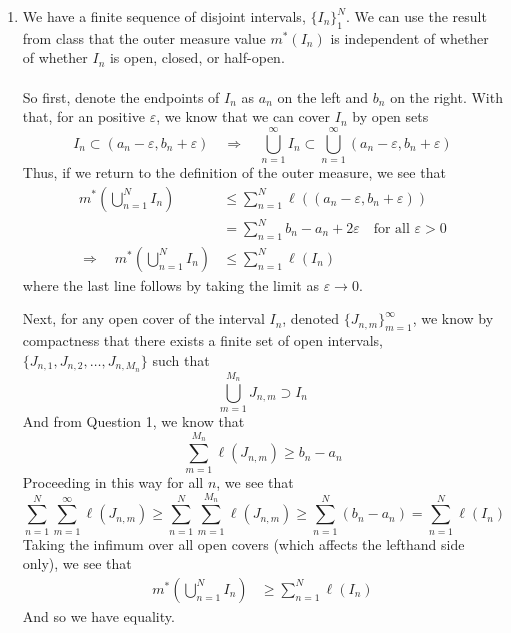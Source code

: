 \documentclass[12pt]{article}
\theoremstyle{plain}
\theoremstyle{definition}
\theoremstyle{remark}
\begin{document}
\begin{enumerate}
\item We have a finite sequence of disjoint intervals, $\{I_n\}_1^N$. We can use the result from class that the outer measure value $m^*(I_n)$ is independent of whether of whether $I_n$ is open, closed, or half-open.
\\
\\
So first, denote the endpoints of $I_n$ as $a_n$ on the left and $b_n$ on the right. With that, for an positive $\varepsilon$, we know that we can cover $I_n$ by open sets
\[
    I_n \subset (a_n-\varepsilon, b_n+\varepsilon)
    \quad \Rightarrow\quad
    \bigcup^\infty_{n=1} I_n \subset 
    \bigcup^\infty_{n=1}(a_n-\varepsilon, b_n+\varepsilon)
\]
Thus, if we return to the definition of the outer measure, we see that 
\begin{align*}
    m^*\left(\bigcup^N_{n=1} I_n\right) &\leq 
    \sum^N_{n=1} \ell\left((a_n-\varepsilon, b_n+\varepsilon)
    \right) \\
    &= \sum^N_{n=1} b_n - a_n + 2\varepsilon 
    \quad \text{for all $\varepsilon>0$}\\
    \Rightarrow\quad
    m^*\left(\bigcup^N_{n=1} I_n\right) &\leq 
    \sum^N_{n=1} \ell(I_n) 
\end{align*}
where the last line follows by taking the limit as $\varepsilon\rightarrow 0$.

Next, for any open cover of the interval $I_n$, denoted $\{J_{n,m}\}_{m=1}^\infty$, we know by compactness that there exists a finite set of open intervals, $\{J_{n,1}, J_{n,2}, \ldots,J_{n,M_n}\}$ such that 
\[
    \bigcup^{M_n}_{m=1} J_{n,m} \supset I_n
\]
And from Question 1, we know that 
\begin{equation}
    \sum^{M_n}_{m=1} \ell(J_{n,m}) \geq b_n - a_n
\end{equation}
Proceeding in this way for all $n$, we see that 
\begin{equation}
    \sum^N_{n=1} 
    \sum^{\infty}_{m=1} \ell(J_{n,m}) \geq 
    \sum^N_{n=1} 
    \sum^{M_n}_{m=1} \ell(J_{n,m})
    \geq \sum^N_{n=1} (b_n - a_n)
    =\sum^N_{n=1} \ell\left(I_n\right)
\end{equation}
Taking the infimum over all open covers (which affects the lefthand side only), we see that 
\begin{align*}
    m^*\left(\bigcup^N_{n=1} I_n\right) &\geq 
    \sum^N_{n=1} \ell(I_n) 
\end{align*}
And so we have equality.






\end{enumerate}
\end{document}
